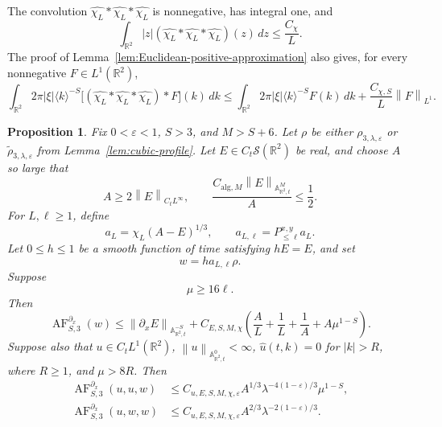 \documentclass[12pt,reqno,letterpaper]{amsart}
\numberwithin{equation}{section}
\newtheorem{proposition}[theorem]{Proposition}
\theoremstyle{definition}
\newcommand{\R}{\mathbb R}
\newcommand{\A}{\mathbb A}
\newcommand{\eps}{\varepsilon}
\newcommand{\la}{\lambda}
\newcommand{\norm}[1]{\left\lVert #1\right\rVert}
\newcommand{\abs}[1]{\left\lvert #1\right\rvert}
\begin{document}
The convolution $\widehat{\chi_L}*\widehat{\chi_L}*\widehat{\chi_L}$ is
nonnegative, has integral one, and
\begin{equation}\label{eq:cubic-spatial-cutoff-moment}
 \int_{\R^2}\abs z
 (\widehat{\chi_L}*\widehat{\chi_L}*\widehat{\chi_L})(z)\,dz
 \leq\frac{C_\chi}{L}.
\end{equation}
The proof of Lemma~\ref{lem:Euclidean-positive-approximation} also gives,
for every nonnegative $F\in L^1(\R^2)$,
\begin{equation}\label{eq:cubic-positive-approximation}
 \int_{\R^2}2\pi\abs\xi\langle k\rangle^{-S}
 \bigl[(\widehat{\chi_L}*\widehat{\chi_L}*
 \widehat{\chi_L})*F\bigr](k)\,dk
 \leq\int_{\R^2}2\pi\abs\xi\langle k\rangle^{-S}F(k)\,dk
   +\frac{C_{\chi,S}}L\norm F_{L^1}.
\end{equation}

\begin{proposition}
\label{prop:cubic-Euclidean-estimate}
Fix $0<\eps<1$, $S>3$, and $M>S+6$.  Let $\rho$ be either
$\rho_{3,\la,\eps}$ or
$\widetilde{\rho}_{3,\la,\eps}$ from
Lemma~\ref{lem:cubic-profile}.  Let
$E\in C_t\mathcal S(\R^2)$ be real, and choose $A$ so large that
\begin{equation}\label{eq:cubic-Euclidean-A}
 A\geq2\norm E_{C_tL^\infty},
 \qquad
 \frac{C_{\mathrm{alg},M}\norm E_{\A^M_{\R^2,t}}}{A}\leq\frac12.
\end{equation}
For $L,\ell\geq1$, define
\begin{equation}\label{eq:cubic-Euclidean-amplitude}
 a_L=\chi_L(A-E)^{1/3},
 \qquad a_{L,\ell}=P_{\leq\ell}^{x,y}a_L.
\end{equation}
Let $0\leq h\leq1$ be a smooth function of time satisfying $hE=E$,
and set
\[
 w=h a_{L,\ell}\rho.
\]
Suppose
\begin{equation*}
 \mu\geq16\ell.
\end{equation*}
Then
\begin{equation*}
 \operatorname{AF}^{\partial_x}_{S,3}(w)
 \leq\norm{\partial_xE}_{\A^{-S}_{\R^2,t}}
  +C_{E,S,M,\chi}\left(
    \frac AL+\frac1L+\frac1A+A\mu^{1-S}\right).
\end{equation*}
Suppose also that $u\in C_tL^1(\R^2)$,
$\norm u_{\A^0_{\R^2,t}}<\infty$,
$\widehat u(t,k)=0$ for $\abs k>R$, where $R\geq1$, and
$\mu>8R$.  Then
\begin{align*}
 \operatorname{AF}^{\partial_x}_{S,3}(u,u,w)
 &\leq C_{u,E,S,M,\chi,\eps}A^{1/3}
   \la^{-4(1-\eps)/3}\mu^{1-S},\\
 \operatorname{AF}^{\partial_x}_{S,3}(u,w,w)
 &\leq C_{u,E,S,M,\chi,\eps}A^{2/3}
   \la^{-2(1-\eps)/3}.
\end{align*}
\end{proposition}
\end{document}
